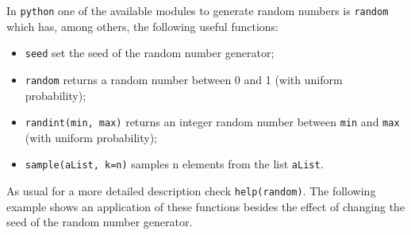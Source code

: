 In \texttt{python} one of the available modules to generate random numbers is \texttt{random} which has, among others, the following useful functions:
\begin{itemize}
\tightlist
\item
  \texttt{seed} set the seed of the random number generator;
\item
  \texttt{random} returns a random number between 0 and 1 (with uniform
  probability);
\item
  \texttt{randint(min,\ max)} returns an integer random number between
  \texttt{min} and \texttt{max} (with uniform probability);
\item
  \texttt{sample(aList,\ k=n)} samples n elements from the list
  \texttt{aList}.
\end{itemize}
As usual for a more detailed description check \texttt{help(random)}.
The following example shows an application of these functions besides the effect of  changing the seed of the random number generator.

